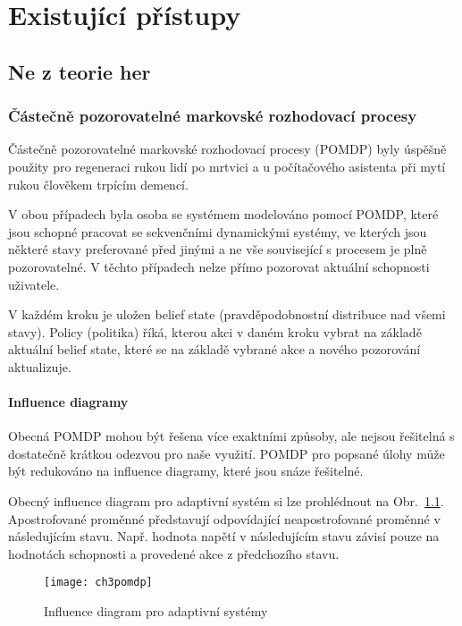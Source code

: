 \chapter{Existující přístupy}

\section{Ne z teorie her}

\subsection{Částečně pozorovatelné markovské rozhodovací procesy}

Částečně pozorovatelné markovské rozhodovací procesy (POMDP) byly úspěšně použity pro regeneraci rukou lidí po mrtvici \cite{9Pomdp} a u počítačového asistenta při mytí rukou člověkem trpícím demencí.

V obou případech byla osoba se systémem modelováno pomocí POMDP, které jsou schopné pracovat se sekvenčními dynamickými systémy, ve kterých jsou některé stavy preferované před jinými a ne vše související s procesem je plně pozorovatelné. V těchto případech nelze přímo pozorovat aktuální schopnosti uživatele.

V každém kroku je uložen belief state (pravděpodobnostní distribuce nad všemi stavy). Policy (politika) říká, kterou akci v daném kroku vybrat na základě aktuální belief state, které se na základě vybrané akce a nového pozorování aktualizuje.

\subsubsection{Influence diagramy}

Obecná POMDP mohou být řešena více exaktními způsoby, ale nejsou řešitelná s dostatečně krátkou odezvou pro naše využití. POMDP pro popsané úlohy může být redukováno na influence diagramy, které jsou snáze řešitelné.
 
Obecný influence diagram pro adaptivní systém si lze prohlédnout na Obr.~\ref{fig:ch3pomdp}. Apostrofované proměnné představují odpovídající neapostrofované proměnné v následujícím stavu. Např. hodnota napětí v následujícím stavu závisí pouze na hodnotách schopnosti a provedené akce z předchozího stavu.

\begin{figure}
  \centering
  \texttt{[image: ch3pomdp]}
	\caption{Influence diagram pro adaptivní systémy}
	\label{fig:ch3pomdp}
\end{figure}

